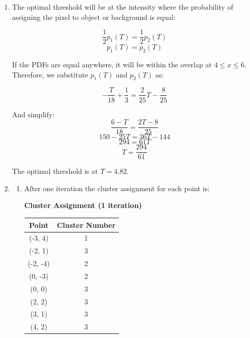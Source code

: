 \documentclass{article}
\begin{document}
\begin{enumerate}
    The result of this operation is the image J. The opening removes pixels from the image wherever the structuring element
    cannot fit inside the image. The right angle shape of SE2 easily fits everywhere except the bottom right corner where
    it cuts off the two bottom-rightmost two pixels.

    \item
    The optimal threshold will be at the intensity where the probability of assigning the pixel to object or background
    is equal:

    \[
        \frac{1}{2}p_1(T)=\frac{1}{2}p_2(T)
    \]
    \[
        p_1(T)=p_2(T)
    \]

    If the PDFs are equal anywhere, it will be within the overlap at \(4 \leq x \leq 6\). Therefore, we
    substitute \(p_1(T)\) and \(p_2(T)\) as:

    \[
        -\frac{T}{18} + \frac{1}{3}=\frac{2}{25}T - \frac{8}{25}
    \]

    And simplify:
    \[
        \frac{6 - T}{18}=\frac{2T-8}{25}
    \]
    \[
        150 - 25T = 36T - 144
    \]
    \[
        294 = 61T
    \]
    \[
        T = \frac{294}{61}
    \]

    The optimal threshold is at \(T=4.82\).

    \item

    \begin{enumerate}
        \item

        After one iteration the cluster assignment for each point is:
        \begin{center}
            \textbf{Cluster Assignment (1 iteration)} \\
            \begin{tabular}{|c|c|}
            \hline
            Point & Cluster Number \\
            \hline
            (-3, 4) & 1 \\
            \hline
            (-2, 1) & 3 \\
            \hline
            (-2, -4) & 2 \\
            \hline
            (0, -3) & 2 \\
            \hline
            (0, 0) & 3 \\
            \hline
            (2, 2) & 3 \\
            \hline
            (3, 1) & 3 \\
            \hline
            (4, 2) & 3 \\
            \hline
            \end{tabular}
        \end{center}


\end{enumerate}
\end{enumerate}
\end{document}
